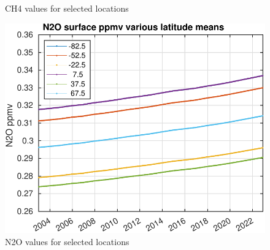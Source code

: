 \documentclass[10pt,t]{beamer}
\begin{document}
\begin{frame}
\begin{figure}
\begin{minipage}[c]{0.3\linewidth}
    \caption{CH4 values for selected locations}
  \end{minipage}
\hfill
  \begin{minipage}[c]{0.3\linewidth}
    \includegraphics[width=\linewidth]{./Figs/n2o_ppmv_trend_zonal.pdf}
    \caption{N2O values for selected locations}
  \end{minipage}
\end{figure}  

\end{frame}
\end{document}
